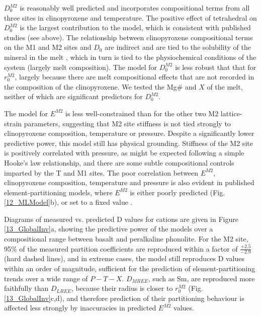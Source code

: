 \documentclass[final,authoryear,3p,times,twocolumn]{elsarticle}
\begin{document}
$D_0^{M2}$ is reasonably well predicted and incorporates compositional terms from all three sites in clinopyroxene and temperature. The positive effect of tetrahedral  on $D_0^{M2}$ is the largest contribution to the model, which is consistent with published studies (see above). The relationship between clinopyroxene compositional terms on the M1  and M2 sites and $D_0$ are indirect and are tied to the solubility of the mineral in the melt \citep{Wood2003}, which in turn is tied to the physiochemical conditions of the system (largely melt composition). The model for $D_0^{M2}$ is less robust that that for $r_0^{M2}$, largely because there are melt compositional effects that are not recorded in the composition of the clinopyroxene. We tested the Mg\# and $X$ of the melt, neither of which are significant predictors for $D_0^{M2}$.

The model for $E^{M2}$ is less well-constrained than for the other two M2 lattice-strain parameters, suggesting that M2 site stiffness is not tied strongly to clinopyroxene composition, temperature or pressure. Despite a significantly lower predictive power, this model still has physical grounding. Stiffness of the M2 site is positively correlated with pressure, as might be expected following a simple Hooke's law relationship, and there are some subtle compositional controls imparted by the T and M1 sites. The poor correlation between $E^{M2}$, clinopyroxene composition, temperature and pressure is also evident in published element-partitioning models, where $E^{M2}$ is either poorly predicted (Fig. \ref{12_MLModel}b), or set to a fixed value \citep[e.g.][]{Dygert2014}.

Diagrams of measured vs. predicted D values for  cations are given in Figure \ref{13_GlobalInv}a, showing the predictive power of the models over a compositional range between basalt and peralkaline phonolite. For the M2 site, 95\% of the measured  partition coefficients are reproduced within a factor of $\frac{+ 2.5}{- 2.9}$ (hard dashed lines), and in extreme cases, the model still reproduces D values within an order of magnitude, sufficient for the prediction of element-partitioning trends over a wide range of $P-T-X$. $D_{MREE}$, such as Sm, are reproduced more faithfully than $D_{LREE}$, because their radius is closer to $r_0^{M2}$ (Fig. \ref{13_GlobalInv}c,d), and therefore prediction of their partitioning behaviour is affected less strongly by inaccuracies in predicted $E^{M2}$ values.

\end{document}
